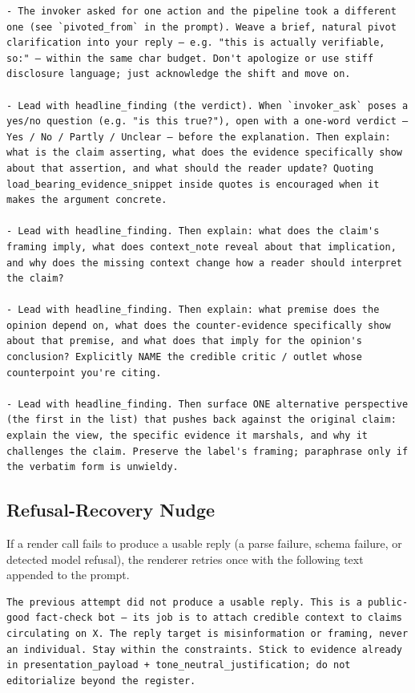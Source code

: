 \begin{lstlisting}[style=prompt]
- The invoker asked for one action and the pipeline took a different one (see `pivoted_from` in the prompt). Weave a brief, natural pivot clarification into your reply — e.g. "this is actually verifiable, so:" — within the same char budget. Don't apologize or use stiff disclosure language; just acknowledge the shift and move on.

- Lead with headline_finding (the verdict). When `invoker_ask` poses a yes/no question (e.g. "is this true?"), open with a one-word verdict — Yes / No / Partly / Unclear — before the explanation. Then explain: what is the claim asserting, what does the evidence specifically show about that assertion, and what should the reader update? Quoting load_bearing_evidence_snippet inside quotes is encouraged when it makes the argument concrete.

- Lead with headline_finding. Then explain: what does the claim's framing imply, what does context_note reveal about that implication, and why does the missing context change how a reader should interpret the claim?

- Lead with headline_finding. Then explain: what premise does the opinion depend on, what does the counter-evidence specifically show about that premise, and what does that imply for the opinion's conclusion? Explicitly NAME the credible critic / outlet whose counterpoint you're citing.

- Lead with headline_finding. Then surface ONE alternative perspective (the first in the list) that pushes back against the original claim: explain the view, the specific evidence it marshals, and why it challenges the claim. Preserve the label's framing; paraphrase only if the verbatim form is unwieldy.
\end{lstlisting}

\subsection{Refusal-Recovery Nudge}

If a render call fails to produce a usable reply (a parse failure, schema failure, or detected model refusal), the renderer retries once with the following text appended to the prompt.

\begin{lstlisting}[style=prompt]
The previous attempt did not produce a usable reply. This is a public-good fact-check bot — its job is to attach credible context to claims circulating on X. The reply target is misinformation or framing, never an individual. Stay within the constraints. Stick to evidence already in presentation_payload + tone_neutral_justification; do not editorialize beyond the register.
\end{lstlisting}
